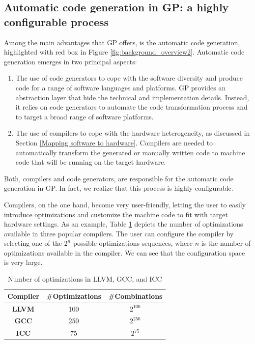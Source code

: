 \subsection{Automatic code generation in GP: a highly configurable process}
Among the main advantages that GP offers, is the automatic code generation, highlighted with red box in Figure \ref{fig:background_overview2}. Automatic code generation emerges in two principal aspects: 
\begin{enumerate}
	\item The use of code generators to cope with the software diversity and produce code for a range of software languages and platforms. GP provides an abstraction layer that hide the technical and implementation details. Instead, it relies on code generators to automate the code transformation process and to target a broad range of software platforms.
	\item The use of compilers to cope with the hardware heterogeneity, as discussed in Section \ref{Mapping software to hardware}. Compilers are needed to automatically transform the generated or manually written code to machine code that will be running on the target hardware.
\end{enumerate}

Both, compilers and code generators, are responsible for the automatic code generation in GP. 
In fact, we realize that this process is highly configurable. 

Compilers, on the one hand, become very user-friendly, letting the user to easily introduce optimizations and customize the machine code to fit with target hardware settings.
As an example, Table \ref{iccgccllvm} depicts the number of optimizations available in three popular compilers. The user can configure the compiler by selecting one of the $2^{n}$ possible optimizations sequences, where $n$ is the number of optimizations available in the compiler. We can see that the configuration space is very large. 

\begin{table}[h]
	\centering
	\caption{Number of optimizations in LLVM, GCC, and ICC}
	\label{my-label}
	\begin{tabular}{|c|c|c|}
		\hline
		\textbf{Compiler} & \textbf{\#Optimizations} & \textbf{\#Combinations} \\ \hline
		\textbf{LLVM}     & 100    & $2^{100}$                                 \\ \hline
		\textbf{GCC}      & 250    & $2^{250}$                                 \\ \hline
		\textbf{ICC}      & 75     & $2^{75}$                                 \\ \hline
	\end{tabular}
	\label{iccgccllvm}
\end{table}

